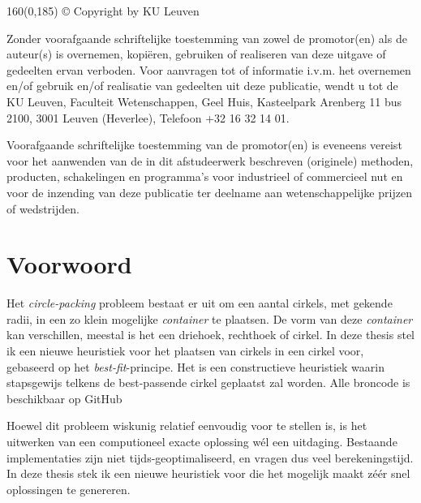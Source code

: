 \documentclass[12pt,a4paper,oneside]{book}
\begin{document}
\newpage
\thispagestyle{empty}
\begin{textblock}{160}(0,185)
© Copyright by KU Leuven

Zonder voorafgaande schriftelijke toestemming van zowel de promotor(en) als de auteur(s) is overnemen, kopiëren, gebruiken of realiseren van deze uitgave of gedeelten ervan verboden. Voor aanvragen tot of informatie i.v.m. het overnemen en/of gebruik en/of realisatie van gedeelten uit deze publicatie, wendt u tot de KU Leuven, Faculteit Wetenschappen, Geel Huis, Kasteelpark Arenberg 11 bus 2100, 3001 Leuven (Heverlee), Telefoon +32 16 32 14 01.

Voorafgaande schriftelijke toestemming van de promotor(en) is eveneens vereist voor het aanwenden van de in dit afstudeerwerk beschreven (originele) methoden, producten, schakelingen en programma’s voor industrieel of commercieel nut en voor de inzending van deze publicatie ter deelname aan wetenschappelijke prijzen of wedstrijden.
\end{textblock}

\newpage

\rmfamily
\setcounter{page}{0}

\newpage

\chapter*{Voorwoord}

Het \textit{circle-packing} probleem bestaat er uit om een aantal cirkels, met gekende radii, in een zo klein mogelijke \textit{container} te plaatsen.
De vorm van deze \textit{container} kan verschillen, meestal is het een driehoek, rechthoek of cirkel.
In deze thesis stel ik een nieuwe heuristiek voor het plaatsen van cirkels in een cirkel voor, gebaseerd op het \textit{best-fit}-principe.
Het is een constructieve heuristiek waarin stapsgewijs telkens de best-passende cirkel geplaatst zal worden.
Alle broncode is beschikbaar op GitHub \cite{circle-packing-github}

Hoewel dit probleem wiskunig relatief eenvoudig voor te stellen is, is het uitwerken van een computioneel exacte oplossing wél een uitdaging.
Bestaande implementaties zijn niet tijds-geoptimaliseerd, en vragen dus veel berekeningstijd. 
In deze thesis stek ik een nieuwe heuristiek voor die het mogelijk maakt zéér snel oplossingen te genereren.
\end{document}
